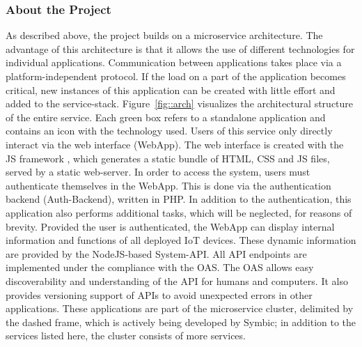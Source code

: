         \subsubsection{About the Project}\label{ssec::project}
        
        \noindent As described above, the project builds on a microservice architecture. The advantage of this architecture is that it allows the use of different technologies for individual applications. Communication between applications takes place via a platform-independent protocol. If the load on a part of the application becomes critical, new instances of this application can be created with little effort and added to the service-stack.\newline
        Figure~\ref{fig::arch} visualizes the architectural structure of the entire service. Each green box refers to a standalone application and contains an icon with the technology used. Users of this service only directly interact via the web interface (WebApp). The web interface is created with the \ac{JS} framework , which generates a static bundle of HTML, CSS and \ac{JS} files, served by a static web-server. In order to access the system, users must authenticate themselves in the WebApp. This is done via the authentication backend (Auth-Backend), written in PHP. In addition to the authentication, this application also performs additional tasks, which will be neglected, for reasons of brevity. Provided the user is authenticated, the WebApp can display internal information and functions of all deployed \ac{IoT} devices. These dynamic information are provided by the NodeJS-based System-\ac{API}. All \ac{API} endpoints are implemented under the compliance with the \ac{OAS}. The \ac{OAS} allows easy discoverability and understanding of the \ac{API} for humans and computers. It also provides versioning support of \ac{API}s to avoid unexpected errors in other applications. These applications are part of the microservice cluster, delimited by the dashed frame, which is actively being developed by Symbic; in addition to the services listed here, the cluster consists of more services.\newline
